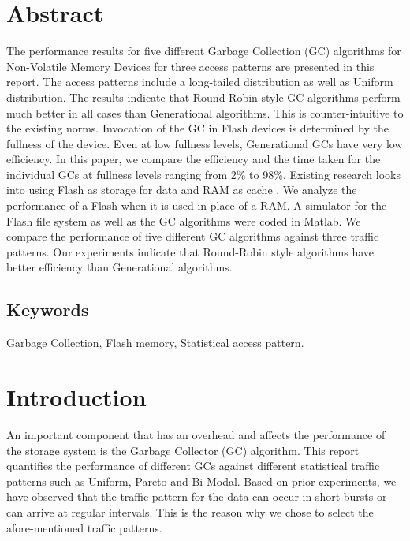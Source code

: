 \section{Abstract}
	The performance results for five different Garbage Collection (GC) algorithms for Non-Volatile Memory Devices for three access patterns are presented in this report. The access patterns include a long-tailed distribution as well as Uniform distribution. The results indicate that Round-Robin style GC algorithms perform much better in all cases than Generational algorithms. This is counter-intuitive to the existing norms. Invocation of the GC in Flash devices is determined by the fullness of the device. Even at low fullness levels, Generational GCs have very low efficiency. In this paper, we compare the efficiency and the time taken for the individual GCs at fullness levels ranging from 2\% to 98\%.  Existing research looks into using Flash as storage for data and RAM as cache \cite{Gupta09, Budilovsky11, Tjioe12}. We analyze the performance of a Flash when it is used in place of a RAM. A simulator for the Flash file system as well as the GC algorithms were coded in Matlab. We compare the performance of five different GC algorithms against three traffic patterns. Our experiments indicate that Round-Robin style algorithms have better efficiency than Generational algorithms.\\

\subsection*{Keywords}
	Garbage Collection, Flash memory, Statistical access pattern.

\section{Introduction}
	An important component that has an overhead and affects the performance of the storage system is the Garbage Collector (GC) algorithm. This report quantifies the performance of different GCs against different statistical traffic patterns such as Uniform, Pareto and Bi-Modal. Based on prior experiments, we have observed that the traffic pattern for the data can occur in short bursts or can arrive at regular intervals. This is the reason why we chose to select the afore-mentioned traffic patterns. \\

